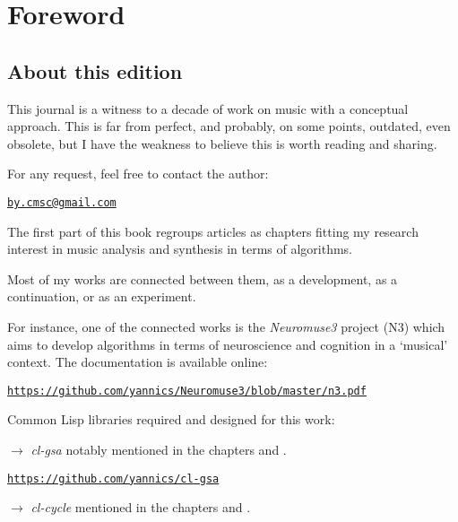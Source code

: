 \frontmatter
\def\thepage{\arabic{page}}
\setcounter{page}{3}

\chapter*{Foreword}
\thispagestyle{empty}

\section*{About this edition}
\label{ate}

This journal is a witness to a decade of work on music with a conceptual approach.
This is far from perfect, and probably, on some points, outdated, even obsolete, but I have the weakness to believe this is worth reading and sharing.

\bigskip
\bigskip

For any request, feel free to contact the author: 

\smallskip

\quad \quad \href{mailto:jby.cmsc@gmail.com}{\texttt{by.cmsc@gmail.com}}

\bigskip
\bigskip

The first part of this book regroups articles as chapters fitting my research interest in music analysis and synthesis in terms of algorithms. 
\smallskip

Most of my works are connected between them, as a development, as a continuation, or as an experiment.

\smallskip
For instance, one of the connected works is the \textsl{Neuromuse3} project (N3) which aims to develop algorithms in terms of neuroscience and cognition in a `musical' context. The documentation is available online:

\href{https://github.com/yannics/Neuromuse3/blob/master/n3.pdf}{\texttt{\small https://github.com/yannics/Neuromuse3/blob/master/n3.pdf}}

\bigskip
\bigskip
Common Lisp libraries required and designed for this work:

\smallskip

\noindent $\rightarrow$ \textsl{cl-gsa} notably mentioned in the chapters \textsl{} and \textsl{}.

\href{https://github.com/yannics/cl-gsa}{\texttt{\small https://github.com/yannics/cl-gsa}}

\smallskip

\noindent $\rightarrow$ \textsl{cl-cycle} mentioned in the chapters \textsl{} and  \textsl{}. 


